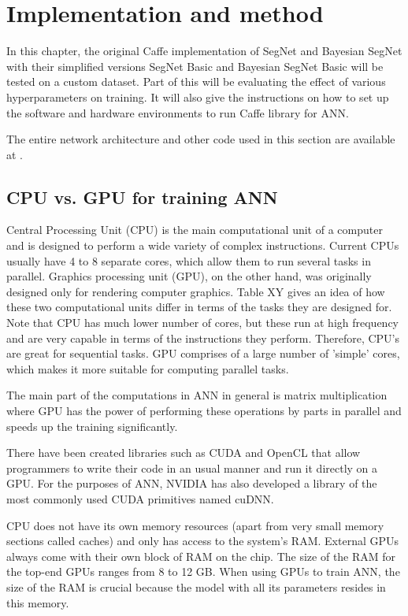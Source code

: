 \chapter{Implementation and method}

In this chapter, the original Caffe implementation of SegNet and Bayesian SegNet with their simplified versions SegNet Basic and Bayesian SegNet Basic will be tested on a custom dataset. Part of this will be evaluating the effect of various hyperparameters on training. It will also give the instructions on how to set up the software and hardware environments to run Caffe library for ANN.

The entire network architecture and other code used in this section are available at \cite{filip_github}.

\section{CPU vs. GPU for training ANN}

Central Processing Unit (CPU) is the main computational unit of a computer and is designed to perform a wide variety of complex instructions. Current CPUs usually have 4 to 8 separate cores, which allow them to run several tasks in parallel. Graphics processing unit (GPU), on the other hand, was originally designed only for rendering computer graphics. Table XY gives an idea of how these two computational units differ in terms of the tasks they are designed for. Note that CPU has much lower number of cores, but these run at high frequency and are very capable in terms of the instructions they perform. Therefore, CPU's are great for sequential tasks. GPU comprises of a large number of 'simple' cores, which makes it more suitable for computing parallel tasks. 

The main part of the computations in ANN in general is matrix multiplication where GPU has the power of performing these operations by parts in parallel and speeds up the training significantly.

There have been created libraries such as CUDA and OpenCL that allow programmers to write their code in an usual manner and run it directly on a GPU. For the purposes of ANN, NVIDIA has also developed a library of the most commonly used CUDA primitives named cuDNN. 
 
CPU does not have its own memory resources (apart from very small memory sections called caches) and only has access to the system's RAM. External GPUs always come with their own block of RAM on the chip. The size of the RAM for the top-end GPUs ranges from 8 to 12 GB. When using GPUs to train ANN, the size of the RAM is crucial because the model with all its parameters resides in this memory. 

